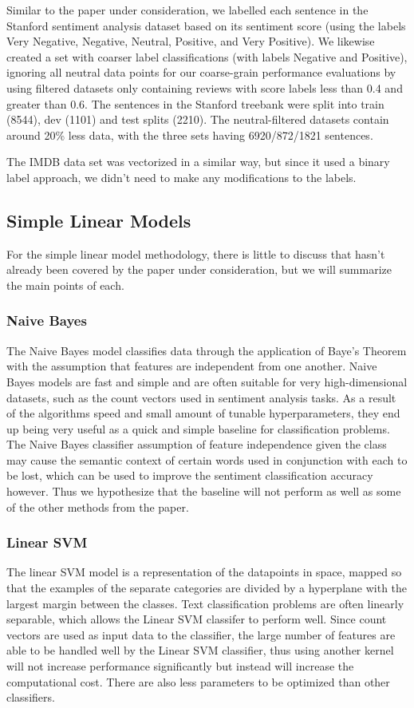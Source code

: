 \documentclass[conference]{IEEEtran}
\begin{document}
Similar to the paper under consideration, we labelled each sentence in the Stanford sentiment analysis dataset based on its sentiment score (using the labels Very Negative, Negative, Neutral, Positive, and Very Positive). We likewise created a set with coarser label classifications (with labels Negative and Positive), ignoring all neutral data points for our coarse-grain performance evaluations by using filtered datasets only containing reviews with score labels less than 0.4 and greater than 0.6. The sentences in the Stanford treebank were split into train (8544), dev (1101) and test splits (2210). The neutral-filtered datasets contain around 20\% less data, with the three sets having 6920/872/1821 sentences.


The IMDB data set was vectorized in a similar way, but since it used a binary label approach, we didn't need to make any modifications to the labels.

\subsection{Simple Linear Models}

For the simple linear model methodology, there is little to discuss that hasn't already been covered by the paper under consideration, but we will summarize the main points of each. 

\subsubsection{Naive Bayes}
The Naive Bayes model classifies data through the application of Baye's Theorem with the assumption that features are independent from one another. Naive Bayes models are fast and simple and are often suitable for very high-dimensional datasets, such as the count vectors used in sentiment analysis tasks. As a result of the algorithms speed and small amount of tunable hyperparameters, they end up being very useful as a quick and simple baseline for classification problems. The Naive Bayes classifier assumption of feature independence given the class may cause the semantic context of certain words used in conjunction with each to be lost, which can be used to improve the sentiment classification accuracy however. Thus we hypothesize that the baseline will not perform as well as some of the other methods from the paper.

\subsubsection{Linear SVM}
The linear SVM model is a representation of the datapoints in space, mapped so that the examples of the separate categories are divided by a hyperplane with the largest margin between the classes. Text classification problems are often linearly separable, which allows the Linear SVM classifer to perform well. Since count vectors are used as input data to the classifier, the large number of features are able to be handled well by the Linear SVM classifier, thus using another kernel will not increase performance significantly but instead will increase the computational cost. There are also less parameters to be optimized than other classifiers.
\end{document}
